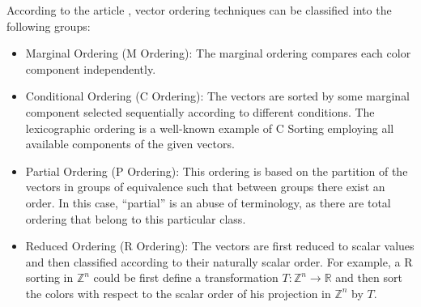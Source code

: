 
  

According to the article \cite{barnett1976ordering}, vector ordering techniques can be classified into the following groups:
\begin{itemize}
\item Marginal Ordering (M Ordering): The marginal ordering compares each color component independently.
\item Conditional Ordering (C Ordering): The vectors are sorted by some marginal component selected sequentially according to different conditions. The lexicographic ordering is a well-known example of C Sorting  employing all available components of the given vectors.
\item Partial Ordering (P Ordering): This ordering is based on the partition of the vectors in groups of equivalence such that between groups there exist an order. In this case, ``partial'' is an abuse of terminology, as there are total ordering that belong to this particular class. 
\item Reduced Ordering (R Ordering): The vectors are first reduced to scalar values and then classified according to their naturally scalar order. For example, a R sorting in  $\mathbb{Z}^n$ could be first define a transformation $T:\mathbb{Z}^n\rightarrow \mathbb{R}$ and then sort the colors with respect to the scalar order of his projection in $\mathbb{Z}^n$ by $T$.
\end{itemize}

